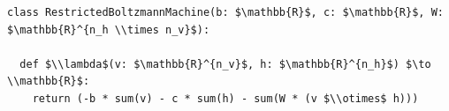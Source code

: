 \documentclass[border=10pt]{standalone}
\begin{document}
\begin{lstlisting}
class RestrictedBoltzmannMachine(b: $\mathbb{R}$, c: $\mathbb{R}$, W: $\mathbb{R}^{n_h \\times n_v}$):

  def $\\lambda$(v: $\mathbb{R}^{n_v}$, h: $\mathbb{R}^{n_h}$) $\to \\mathbb{R}$:
    return (-b * sum(v) - c * sum(h) - sum(W * (v $\\otimes$ h)))
\end{lstlisting}
\end{document}

